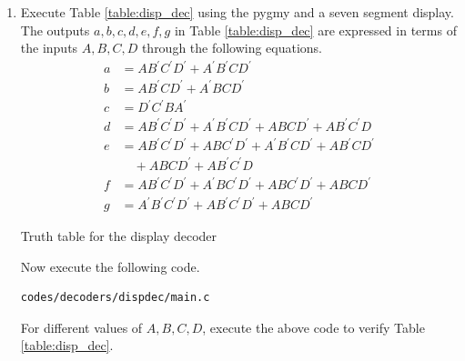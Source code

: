 \documentclass[journal,12pt,twocolumn]{IEEEtran}
\renewcommand\thesection{\arabic{section}}
\begin{document}
\begin{enumerate}[label=\thesection.\arabic*.,ref=\thesection.\theenumi]



\item Execute Table  \ref{table:disp_dec} using the pygmy and a seven segment display. 
\\
\solution The outputs $a,b,c,d,e,f,g$ in Table  \ref{table:disp_dec}  are expressed in terms of the inputs  $A,B,C,D$ through the following
equations. 
%
\begin{align}
\label{eq:disp_a}
a &= AB^{\prime}C^{\prime}D^{\prime}+A^{\prime}B^{\prime}CD^{\prime}
\\
\label{eq:disp_b}
b &= AB^{\prime}CD^{\prime}+A^{\prime}BCD^{\prime}
\\
\label{eq:disp_c}
c &= {D}^{\prime}{C}^{\prime}B{A}^{\prime}
\\
d &= AB^{\prime}C^{\prime}D^{\prime}+A^{\prime}B^{\prime}CD^{\prime}+ABCD^{\prime}+AB^{\prime}C^{\prime}D
\label{eq:disp_d}
\\
e &= AB^{\prime}C^{\prime}D^{\prime}+ABC^{\prime}D^{\prime}+A^{\prime}B^{\prime}CD^{\prime}+AB^{\prime}CD^{\prime}
\nonumber \\
&\quad +ABCD^{\prime}+AB^{\prime}C^{\prime}D
\label{eq:disp_e}
\\
f &= AB^{\prime}C^{\prime}D^{\prime}+A^{\prime}BC^{\prime}D^{\prime}+ABC^{\prime}D^{\prime}+ABCD^{\prime}
\label{eq:disp_f}
\\
g &= A^{\prime}B^{\prime}C^{\prime}D^{\prime}+AB^{\prime}C^{\prime}D^{\prime}+ABCD^{\prime}
\label{eq:disp_g}
\end{align}
\begin{table}
\centering

\caption{Truth table for the display decoder}
\label{table:disp_dec}
\end{table}
%
Now execute the following code.  
\begin{lstlisting}
codes/decoders/dispdec/main.c
\end{lstlisting}
For different values of $A,B,C,D$, execute the above code to verify Table \ref{table:disp_dec}.



\end{enumerate}
\end{document}
